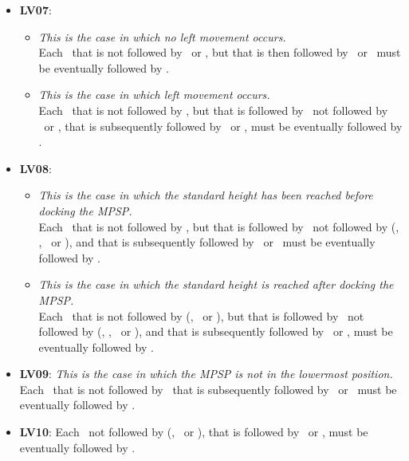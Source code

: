 \begin{itemize}
    \item \textbf{LV07}:
    \begin{itemize}
    \item \textit{This is the case in which no left movement occurs.}\\
    Each \dock\ that is not followed by \undock\ or \motorLeft, but that is then followed by \tapReset\ or \pressReset\ must be eventually followed by \setStandardHeight.

    \item \textit{This is the case in which left movement occurs.}\\
    Each \dock\ that is not followed by \undock, but that is followed by \rightmostReached\ not followed by \undock\ or \motorLeft, that is subsequently followed by \tapReset\ or \pressReset, must be eventually followed by \setStandardHeight.
    \end{itemize}

    \item \textbf{LV08}:
    \begin{itemize}
    \item \textit{This is the case in which the standard height has been reached before docking the MPSP.}\\
    Each \dock\ that is not followed by \undock, but that is followed by \standardHeightReached\ not followed by (\tapUp, \pressUp, \motorDown\ or \undock), and that is subsequently followed by \tapUp\ or \pressUp\, must be eventually followed by \motorLeft.

    \item \textit{This is the case in which the standard height is reached after docking the MPSP.}\\
    Each \setStandardHeight\ that is not followed by (\motorDown, \motorUp\ or \resetStandardHeight), but that is followed by \dock\ not followed by (\tapUp, \pressUp, \motorDown\ or \undock), and that is subsequently followed by \tapUp\ or \pressUp, must be eventually followed by \motorLeft.
    \end{itemize}
    \item \textbf{LV09}: \textit{This is the case in which the MPSP is not in the lowermost position.}\\
    Each \motorLeft\ that is not followed by \rightmostReached\ that is subsequently followed by \tapDown\ or \pressDown\ must be eventually followed by \motorRight.

    \item \textbf{LV10}: Each \motorUp\ not followed by (\lowermostReached, \motorLeft\ or \emergencyMode), that is followed by \tapDown\ or \pressDown, must be eventually followed by \motorDown.


\end{itemize}
